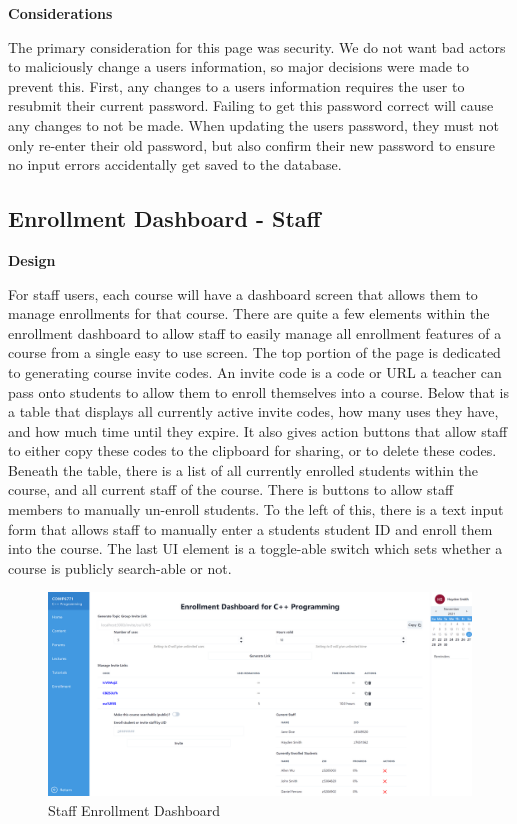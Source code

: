 \textbf{Considerations}

The primary consideration for this page was security. We do not want bad actors to maliciously change a users information, so major decisions were made to prevent this. First, any changes to a users information requires the user to resubmit their current password. Failing to get this password correct will cause any changes to not be made. When updating the users password, they must not only re-enter their old password, but also confirm their new password to ensure no input errors accidentally get saved to the database.

\subsection{Enrollment Dashboard - Staff}

\textbf{Design}

For staff users, each course will have a dashboard screen that allows them to manage enrollments for that course. There are quite a few elements within the enrollment dashboard to allow staff to easily manage all enrollment features of a course from a single easy to use screen. The top portion of the page is dedicated to generating course invite codes. An invite code is a code or URL a teacher can pass onto students to allow them to enroll themselves into a course. Below that is a table that displays all currently active invite codes, how many uses they have, and how much time until they expire. It also gives action buttons that allow staff to either copy these codes to the clipboard for sharing, or to delete these codes. Beneath the table, there is a list of all currently enrolled students within the course, and all current staff of the course. There is buttons to allow staff members to manually un-enroll students. To the left of this, there is a text input form that allows staff to manually enter a students student ID and enroll them into the course. The last UI element is a toggle-able switch which sets whether a course is publicly search-able or not.

\begin{figure}[h!]
    \centering
    \includegraphics[scale=0.1]{images/accounts-enrollment-dashboard.png}
    \caption{Staff Enrollment Dashboard}
\end{figure}

